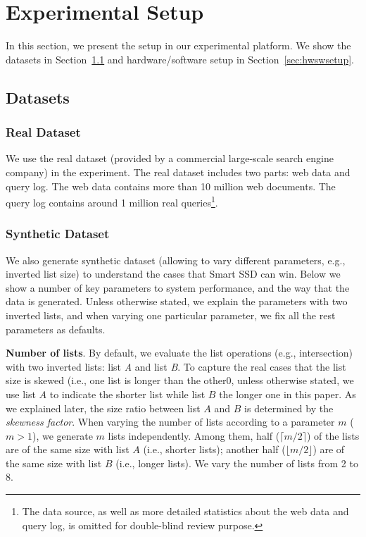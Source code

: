 
\section{Experimental Setup}\label{sec:expSetup}
In this section, we present the setup in our experimental platform. We show the datasets in Section~\ref{sec:datasets} and hardware/software setup in Section~\ref{sec:hwswsetup}.

\subsection{Datasets}\label{sec:datasets}

\subsubsection{Real Dataset}

We use the real dataset (provided by a commercial large-scale search engine company) in the experiment. The real dataset includes two parts: web data and query log. The web data contains more than 10 million web documents. The query log contains around 1 million real queries\footnote{The data source, as well as more detailed statistics about the web data and query log, is omitted for double-blind review purpose.}.


\subsubsection{Synthetic Dataset}
We also generate synthetic dataset (allowing to vary different parameters, e.g., inverted list size) to understand the cases that Smart SSD can win.
Below we show a number of key parameters to system performance, and the way that the data is generated.
Unless otherwise stated, we explain the parameters with two inverted lists, and when varying one particular parameter, we fix all the rest parameters as defaults.


\textbf{Number of lists}. By default, we evaluate the list operations (e.g., intersection) with two inverted lists: list \emph{A} and list \emph{B}. To capture the real cases that the list size is skewed (i.e., one list is longer than the other0, unless otherwise stated, we use list $A$ to indicate the shorter list while list $B$ the longer one in this paper. As we explained later, the size ratio between list $A$ and $B$ is determined by the \emph{skewness factor}. When varying the number of lists according to a parameter $m$ ($m>1$), we generate $m$ lists independently. Among them, half ($\lceil m/2\rceil$) of the lists are of the same size with list $A$ (i.e., shorter lists); another half ($\lfloor m/2\rfloor$) are of the same size with list $B$ (i.e., longer lists). We vary the number of lists from 2 to 8.

